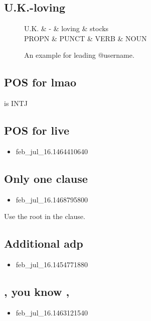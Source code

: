 \documentclass[11pt,a4paper]{article}
\begin{document}
\subsection{U.K.-loving}
\begin{figure}[t]
	\centering
	\small
	\begin{dependency}[edge slant=2, text only label, label style=above]
		\begin{deptext}
			U.K. \& - \& loving \& stocks \\
			PROPN \& PUNCT \& VERB \& NOUN \\
		\end{deptext}
	\end{dependency}
	\caption{An example for leading @username.}\label{fig:case-08}
\end{figure}

\subsection{POS for lmao}
is \textsc{INTJ}

\subsection{POS for live}
\begin{itemize}
	\item feb\_jul\_16.1464410640
\end{itemize}

\subsection{Only one clause}
\begin{itemize}
	\item feb\_jul\_16.1468795800
\end{itemize}
Use the root in the clause.

\subsection{Additional adp}
\begin{itemize}
	\item feb\_jul\_16.1454771880
\end{itemize}

\subsection{, you know ,}
\begin{itemize}
	\item feb\_jul\_16.1463121540
\end{itemize}
\end{document}
